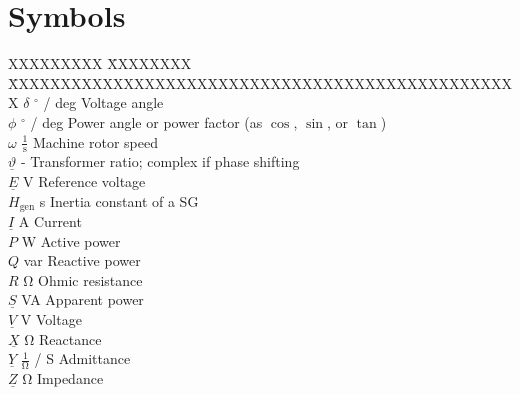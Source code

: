 \chapter*{Symbols}
\label{chap:symbols}

\begin{tabbing}
    XXXXXXXXX \= XXXXXXXX \= XXXXXXXXXXXXXXXXXXXXXXXXXXXXXXXXXXXXXXXXXXXXXXXXX \kill
    $\delta$                \> $^\circ$ / deg                   \> Voltage angle \\
    $\phi$                  \> $^\circ$ / deg                   \> Power angle or power factor (as $\cos$, $\sin$, or $\tan$) \\
    $\omega$                \> $\mathrm{\frac{1}{s}}$           \> Machine rotor speed \\
    $\underline{\vartheta}$ \> -                                \> Transformer ratio; complex if phase shifting \\
    $\underline{E}$         \> V                                \> Reference voltage \\
    $H_\mathrm{gen}$        \> s                                \> Inertia constant of a \acf{SG} \\
    $\underline{I}$         \> A                                \> Current \\
    $P$                     \> W                                \> Active power\\
    $Q$                     \> var                              \> Reactive power \\
    $R$                     \> $\mathrm{\Omega}$                \> Ohmic resistance \\
    $\underline{S}$         \> VA                               \> Apparent power \\
    $\underline{V}$         \> V                                \> Voltage \\
    $\underline{X}$         \> $\mathrm{\Omega}$                \> Reactance \\
    $\underline{Y}$         \> $\mathrm{\frac{1}{\Omega}}$ / S  \> Admittance \\
    $\underline{Z}$         \> $\mathrm{\Omega}$                \> Impedance \\
\end{tabbing}

